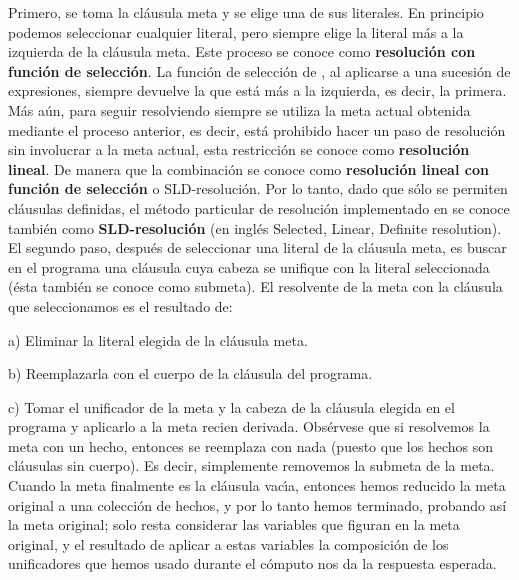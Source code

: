 \documentclass[11pt,letterpaper]{article}
\begin{document}
Primero, se toma la cl\'ausula meta y se elige una de sus literales. En
principio podemos seleccionar cualquier literal, pero {\pl} siempre elige
la literal m\'as a la izquierda de la cl\'ausula meta. Este proceso se
conoce como {\bf resoluci\'on con funci\'on de selecci\'on}. La funci\'on
de selecci\'on de {\pl}, al aplicarse a una sucesi\'on de expresiones,
siempre devuelve la que est\'a m\'as a la izquierda, es decir, la
primera. M\'as a\'un, para seguir resolviendo siempre se utiliza la meta
actual obtenida mediante el proceso anterior, es decir, est\'a prohibido
hacer un paso de resoluci\'on sin involucrar a la meta actual, esta
restricci\'on se conoce como {\bf resoluci\'on lineal}. De manera que la
combinaci\'on se conoce como \textbf{resoluci\'on lineal con funci\'on de
selecci\'on} o SLD-resoluci\'on. Por lo tanto, dado que s\'olo se
permiten cl\'ausulas definidas, el m\'etodo particular
de resoluci\'on implementado en {\pl} se conoce tambi\'en como
{\bf SLD-resoluci\'on }(en ingl\'es Selected, Linear, Definite resolution).\\
El segundo paso, despu\'es de seleccionar una literal de la cl\'ausula meta,
es buscar en el programa una cl\'ausula cuya cabeza se unifique con la
literal seleccionada (\'esta tambi\'en se conoce como submeta). El
resolvente de la meta con la cl\'ausula que seleccionamos es el resultado
de:
\bi
\item[a)] Eliminar la literal elegida de la cl\'ausula meta.
\item[b)] Reemplazarla con el cuerpo de la cl\'ausula del programa.
\item[c)] Tomar el unificador de la meta y la cabeza de la cl\'ausula
elegida en el programa y aplicarlo a la meta recien derivada.   
\ei 
Obs\'ervese que si resolvemos la meta con un hecho, entonces  se
reemplaza con nada (puesto que los hechos son cl\'ausulas sin cuerpo). Es decir, simplemente removemos la submeta de la meta. Cuando la meta finalmente
es la cl\'ausula vac\'{\i}a, entonces hemos reducido la meta original a una
colecci\'on de hechos, y por lo tanto hemos terminado, probando as\'i la meta
original; solo resta considerar las variables que figuran en la meta original,  y el
resultado de aplicar a estas variables la composici\'on de los unificadores
que hemos usado durante el c\'omputo nos da la respuesta esperada.
\end{document}
